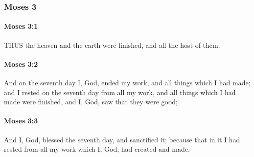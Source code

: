 	\subsubsection{Moses 3} %
		\label{MOSES-3}
		
		\paragraph{Moses 3:1} %
			\label{MOSES-3-1}

			THUS the heaven and the earth were finished, and all the host of them.


		\paragraph{Moses 3:2} %
			\label{MOSES-3-2}

			And on the seventh day I, God, ended my work, and all things which I had made; and I rested on the seventh day from all my work, and all things which I had made were finished, and I, God, saw that they were good;


		\paragraph{Moses 3:3} %
			\label{MOSES-3-3}

			And I, God, blessed the seventh day, and sanctified it; because that in it I had rested from all my work which I, God, had created and made.

